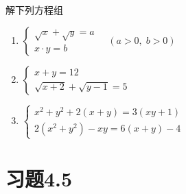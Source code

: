 \begin{ex}
解下列方程组
\begin{enumerate}
    \item $\begin{cases}
        \sqrt{x}+\sqrt{y}=a\\
        x\cdot y=b
    \end{cases}\quad (a>0,\; b>0)$
    \item $\begin{cases}
        x+y=12\\ \sqrt{x+2}+\sqrt{y-1}=5
    \end{cases}$
    \item $\begin{cases}
        x^2+y^2+2(x+y)=3(xy+1)\\
        2(x^2+y^2)-xy=6(x+y)-4
    \end{cases}$
\end{enumerate}
\end{ex}

\section*{习题4.5}

